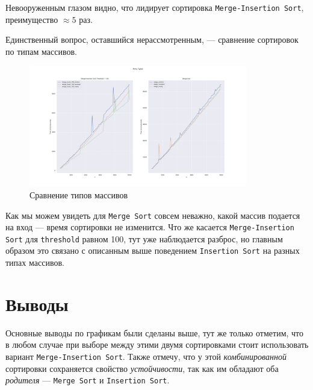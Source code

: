 \documentclass[11pt,a4paper]{scrarticle}
\theoremstyle{definition}
\begin{document}
Невооруженным глазом видно, что лидирует сортировка \texttt{Merge-Insertion Sort}, преимущество $\approx 5$ раз.

Единственный вопрос, оставшийся нерассмотренным, ---  сравнение сортировок по типам массивов.

\begin{figure}[htp]
	\centering
	\includegraphics[width=0.85\textwidth]{../static/array_types.png}
	\caption{Сравнение типов массивов}
	\label{fig:merge-vs-merge-ins}
\end{figure}
\FloatBarrier

Как мы можем увидеть для \texttt{Merge Sort} совсем неважно, какой массив подается на вход --- время сортировки не изменится. Что же касается \texttt{Merge-Insertion Sort} для \texttt{threshold} равном 100, тут уже наблюдается разброс, но главным образом это связано с описанным выше поведением \texttt{Insertion Sort} на разных типах массивов.

\section*{Выводы}

Основные выводы по графикам были сделаны выше, тут же только отметим, что в любом случае при выборе между этими двумя сортировками стоит использовать вариант \texttt{Merge-Insertion Sort}. Также отмечу, что у этой \emph{комбинированной} сортировки сохраняется свойство \emph{устойчивости}, так как им обладают оба \emph{родителя} --- \texttt{Merge Sort} и \texttt{Insertion Sort}.
\end{document}

